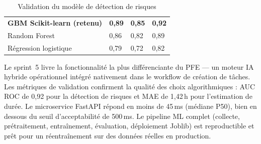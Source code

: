\begin{table}[H]
  \centering
  \caption{Validation du modèle de détection de risques}
  \label{tab:valid_risque}
  \begin{tabularx}{\textwidth}{L{4.5cm}C{3cm}C{3cm}C{3cm}}
    \toprule
     &  &  &  \\
    \midrule
    \textbf{GBM Scikit-learn (retenu)} & \textbf{0,89} & \textbf{0,85} & \textbf{0,92} \\
    Random Forest & 0,86 & 0,82 & 0,89 \\
    Régression logistique & 0,79 & 0,72 & 0,82 \\
    \bottomrule
  \end{tabularx}
\end{table}

\begin{chapconclusion}
Le sprint~5 livre la fonctionnalité la plus différenciante du PFE — un moteur IA
hybride opérationnel intégré nativement dans le workflow de création de tâches.
Les métriques de validation confirment la qualité des choix algorithmiques :
AUC ROC de 0,92 pour la détection de risques et MAE de 1,42\,h pour l'estimation
de durée. Le microservice FastAPI répond en moins de 45\,ms (médiane P50), bien en
dessous du seuil d'acceptabilité de 500\,ms. Le pipeline ML complet (collecte,
prétraitement, entraînement, évaluation, déploiement Joblib) est reproductible et
prêt pour un réentraînement sur des données réelles en production.
\end{chapconclusion}
